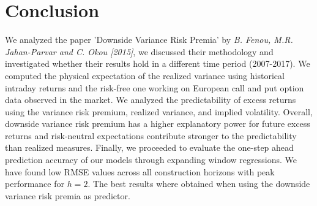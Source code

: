 
\section{Conclusion}\label{sec:chapter6}

We analyzed the paper 'Downside Variance Risk Premia' by \textit{B. Fenou, M.R. Jahan-Parvar and C. Okou [2015]}, we discussed their methodology and investigated whether their results hold in a different time period (2007-2017). We computed the physical expectation of the realized variance using historical intraday returns and the risk-free one working on European call and put option data observed in the market. We analyzed the predictability of excess returns using the variance risk premium, realized variance, and implied volatility. Overall, downside variance risk premium has a higher explanatory power for future excess returns and risk-neutral expectations contribute stronger to the predictability than realized measures.
Finally, we proceeded to evaluate the one-step ahead prediction accuracy of our models through expanding window regressions. We have found low RMSE values across all construction horizons with peak performance for $h=2$. The best results where obtained when using the downside variance risk premia as predictor. 